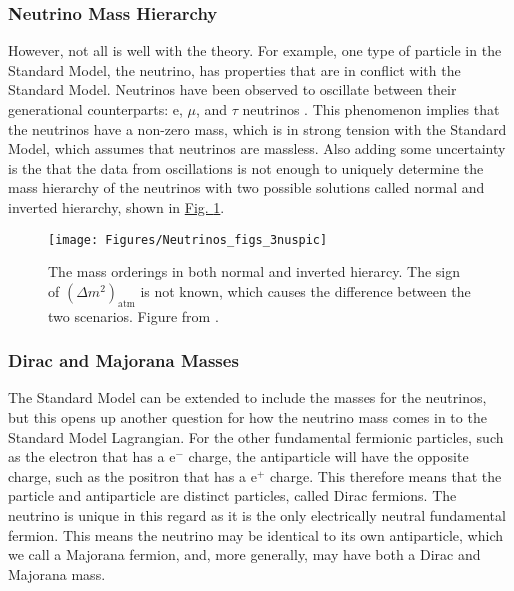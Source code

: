 \documentclass[12pt,a4paper]{article}
\begin{document}
\subsubsection*{Neutrino Mass Hierarchy}
However, not all is well with the theory. For example, one type of particle in the Standard Model, the neutrino, has properties that are in conflict with the Standard Model. Neutrinos have been observed to oscillate between their generational counterparts: e, $\mu$, and $\tau$ neutrinos \cite{PhysRevLett.20.1205}\cite{Hatakeyama:1998ea}\cite{Ahmad:2001an}. This phenomenon implies that the neutrinos have a non-zero mass, which is in strong tension with the Standard Model, which assumes that neutrinos are massless. Also adding some uncertainty is the that the data from oscillations is not enough to uniquely determine the mass hierarchy of the neutrinos with two possible solutions called normal and inverted hierarchy, shown in \hyperref[fig:neutrinosfigs3nuspic]{Fig. \ref*{fig:neutrinosfigs3nuspic}}.

\begin{figure}[tbph]
\centering
\texttt{[image: Figures/Neutrinos\_figs\_3nuspic]}
\caption[The mass orderings in both normal and inverted hierarcy. The sign of $(\Delta m^2)_{\textrm{atm}}$ is not known, which causes the difference between the two scenarios.]{The mass orderings in both normal and inverted hierarcy. The sign of $(\Delta m^2)_{\textrm{atm}}$ is not known, which causes the difference between the two scenarios. Figure from \cite{Hewett:2012ns}.}
\label{fig:neutrinosfigs3nuspic}
\end{figure}

\subsubsection*{Dirac and Majorana Masses}

The Standard Model can be extended to include the masses for the neutrinos, but this opens up another question for how the neutrino mass comes in to the Standard Model Lagrangian. For the other fundamental fermionic particles, such as the electron that has a $\textrm{e}^-$ charge, the antiparticle will have the opposite charge, such as the positron that has a $\textrm{e}^+$ charge. This therefore means that the particle and antiparticle are distinct particles, called Dirac fermions. The neutrino is unique in this regard as it is the only electrically neutral fundamental fermion. This means the neutrino may be identical to its own antiparticle, which we call a Majorana fermion, and, more generally, may have both a Dirac and Majorana mass.
\end{document}
